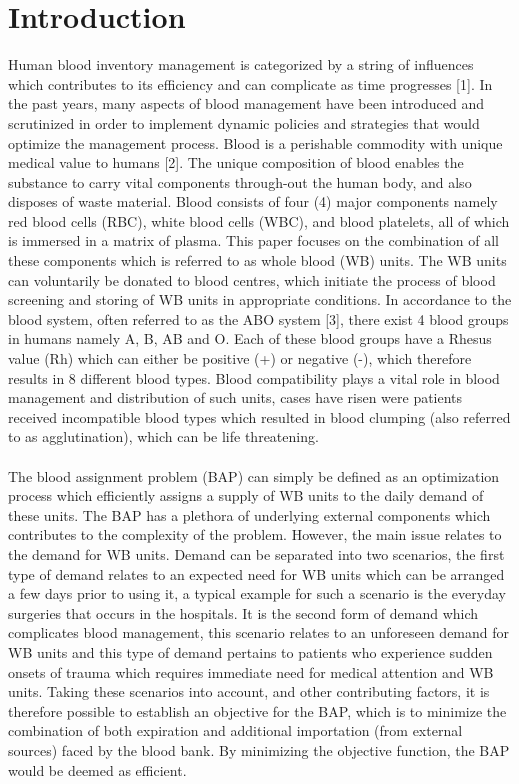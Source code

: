 \documentclass{article}
\begin{document}
\section{Introduction}
Human blood inventory management is categorized by a string of influences which contributes to its efficiency and can complicate as time progresses [1]. In the past years, many aspects of blood management have been introduced and scrutinized in order to implement dynamic policies and strategies that would optimize the management process. Blood is a perishable commodity with unique medical value to humans [2]. The unique composition of blood enables the substance to carry vital components through-out the human body, and also disposes of waste material. Blood consists of four (4) major components namely red blood cells (RBC), white blood cells (WBC), and blood platelets, all of which is immersed in a matrix of plasma. This paper focuses on the combination of all these components which is referred to as whole blood (WB) units. The WB units can voluntarily be donated to blood centres, which initiate the process of blood screening and storing of WB units in appropriate conditions. In accordance to the blood system, often referred to as the ABO system [3], there exist 4 blood groups in humans namely A, B, AB and O. Each of these blood groups have a Rhesus value (Rh) which can either be positive (+) or negative (-), which therefore results in 8 different blood types. Blood compatibility plays a vital role in blood management and distribution of such units, cases have risen were patients received incompatible blood types which resulted in blood clumping (also referred to as agglutination), which can be life threatening. \\
\\
The blood assignment problem (BAP) can simply be defined as an optimization process which efficiently assigns a supply of WB units to the daily demand of these units. The BAP has a plethora of underlying external components which contributes to the complexity of the problem. However, the main issue relates to the demand for WB units. Demand can be separated into two scenarios, the first type of demand relates to an expected need for WB units which can be arranged a few days prior to using it, a typical example for such a scenario is the everyday surgeries that occurs in the hospitals. It is the second form of demand which complicates blood management, this scenario relates to an unforeseen demand for WB units and this type of demand pertains to patients who experience sudden onsets of trauma which requires immediate need for medical attention and WB units. Taking these scenarios into account, and other contributing factors, it is therefore possible to establish an objective for the BAP, which is to minimize the combination of both expiration and additional importation (from external sources) faced by the blood bank. By minimizing the objective function, the BAP would be deemed as efficient.
\end{document}
